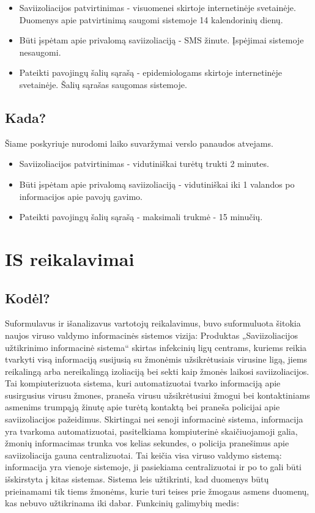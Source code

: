 \documentclass{VUMIFPSkursinis}
\begin{document}
\begin{itemize}
	\item Saviizoliacijos patvirtinimas - visuomenei skirtoje internetinėje svetainėje. Duomenys apie patvirtinimą saugomi sistemoje 14 kalendorinių dienų.
	\item Būti įspėtam apie privalomą saviizoliaciją - SMS žinute. Įspėjimai sistemoje nesaugomi.
	\item Pateikti pavojingų šalių sąrašą - epidemiologams skirtoje internetinėje svetainėje. Šalių sąrašas saugomas sistemoje.
\end{itemize}

\subsection{Kada?}\label{sec:vartotojoReqWhen}

Šiame poskyriuje nurodomi laiko suvaržymai verslo panaudos atvejams.

\begin{itemize}
	\item Saviizoliacijos patvirtinimas - vidutiniškai turėtų trukti 2 minutes.
	\item Būti įspėtam apie privalomą saviizoliaciją - vidutiniškai iki 1 valandos po informacijos apie pavojų gavimo.
	\item Pateikti pavojingų šalių sąrašą - maksimali trukmė - 15 minučių.
\end{itemize}

\section{IS reikalavimai}

\subsection{Kodėl?}\label{sec:ISReqWhy}
Suformulavus ir išanalizavus vartotojų reikalavimus, buvo suformuluota šitokia naujos viruso valdymo informacinės sistemos vizija:
Produktas „Saviizoliacijos užtikrinimo informacinė sistema“ skirtas infekcinių ligų centrams, kuriems reikia tvarkyti visą informaciją susijusią su 
žmonėmis užsikrėtusiais virusine ligą, jiems reikalingą arba nereikalingą izoliaciją bei sekti kaip žmonės laikosi saviizoliacijos.
Tai kompiuterizuota sistema, kuri automatizuotai tvarko informaciją apie susirgusius virusu žmones, praneša virusu užsikrėtusiui žmogui bei kontaktiniams asmenims 
trumpąją žinutę apie turėtą kontaktą bei praneša policijai apie saviizoliacijos pažeidimus. Skirtingai nei senoji informacinė sistema, informacija yra tvarkoma
automatizuotai, pasitelkiama kompiuterinė skaičiuojamoji galia, žmonių informacimas trunka vos kelias sekundes, o policija pranešimus apie saviizoliacija gauna centralizuotai.
Tai keičia visa viruso valdymo sistemą: informacija yra vienoje sistemoje, ji pasiekiama centralizuotai ir po to gali būti išskirstyta į kitas sistemas.
Sistema leis užtikrinti, kad duomenys būtų prieinamami tik tiems žmonėms, kurie turi teises prie žmogaus asmens duomenų, kas nebuvo užtikrinama iki dabar.
\medskip
Funkcinių galimybių medis:
\end{document}
